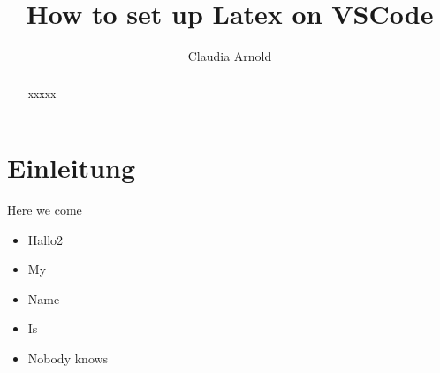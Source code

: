 \documentclass[12pt,titlepage]{article}
\begin{document}
\title{How to set up Latex on VSCode\\}

\author{Claudia Arnold}

\maketitle

\begin{abstract}
   xxxxx
    \end{abstract}

\section{Einleitung}

Here we come 


\begin{itemize}
    \item Hallo2 
    \item My
    \item Name
    \item Is
    \item Nobody knows
\end{itemize}
\end{document}
